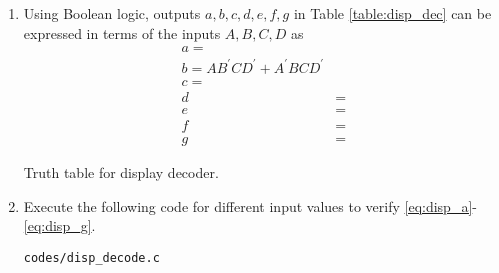\renewcommand{\theequation}{\theenumi}
\renewcommand{\thefigure}{\theenumi}
\begin{enumerate}[label=\thesection.\arabic*.,ref=\thesection.\theenumi]

\item Using Boolean logic, outputs $a,b,c,d,e,f,g$  in Table \ref{table:disp_dec} can be expressed in terms of the inputs $A,B,C,D$ as
%
\begin{align}
\label{eq:disp_a}
a=
\\
\label{eq:disp_b}
b = AB^{\prime}CD^{\prime}+A^{\prime}BCD^{\prime}
\\
\label{eq:disp_c}
c=
\\
d &= 
\label{eq:disp_d}
\\
e &= 
\label{eq:disp_e}
\\
f &= 
\label{eq:disp_f}
\\
g &= 
\label{eq:disp_g}
\end{align}
\begin{table}
\centering

\caption{Truth table for display decoder.}
\label{table:disp_dec}
\end{table}

\item Execute the following code for different input values to verify 
\eqref{eq:disp_a}-\eqref{eq:disp_g}.
\label{code:disp_decode}
\begin{lstlisting}
codes/disp_decode.c
\end{lstlisting}
%
%

\end{enumerate}
%
%
